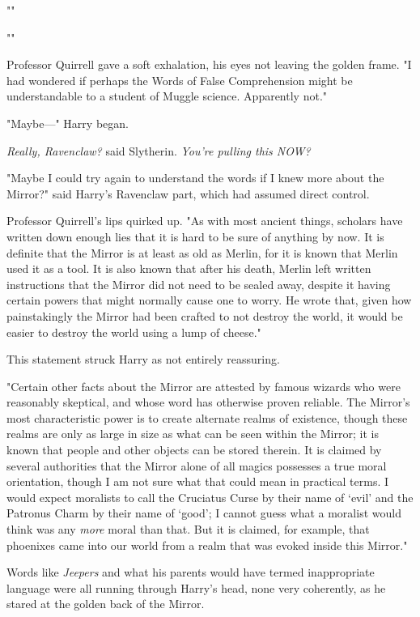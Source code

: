""

""

Professor Quirrell gave a soft exhalation, his eyes not leaving the golden
frame. "I had wondered if perhaps the Words of False Comprehension might be
understandable to a student of Muggle science. Apparently not."

"Maybe---" Harry began.

\emph{Really, Ravenclaw?} said Slytherin. \emph{You're pulling this NOW?}

"Maybe I could try again to understand the words if I knew more about the
Mirror?" said Harry's Ravenclaw part, which had assumed direct control.

Professor Quirrell's lips quirked up. "As with most ancient things, scholars
have written down enough lies that it is hard to be sure of anything by now. It
is definite that the Mirror is at least as old as Merlin, for it is known that
Merlin used it as a tool. It is also known that after his death, Merlin left
written instructions that the Mirror did not need to be sealed away, despite it
having certain powers that might normally cause one to worry. He wrote that,
given how painstakingly the Mirror had been crafted to not destroy the world,
it would be easier to destroy the world using a lump of cheese."

This statement struck Harry as not entirely reassuring.

"Certain other facts about the Mirror are attested by famous wizards who were
reasonably skeptical, and whose word has otherwise proven reliable. The
Mirror's most characteristic power is to create alternate realms of existence,
though these realms are only as large in size as what can be seen within the
Mirror; it is known that people and other objects can be stored therein. It is
claimed by several authorities that the Mirror alone of all magics possesses a
true moral orientation, though I am not sure what that could mean in practical
terms. I would expect moralists to call the Cruciatus Curse by their name of
`evil' and the Patronus Charm by their name of `good'; I cannot guess what a
moralist would think was any \emph{more} moral than that. But it is claimed,
for example, that phoenixes came into our world from a realm that was evoked
inside this Mirror."



Words like \emph{Jeepers} and what his parents would have termed inappropriate
language were all running through Harry's head, none very coherently, as he
stared at the golden back of the Mirror.

